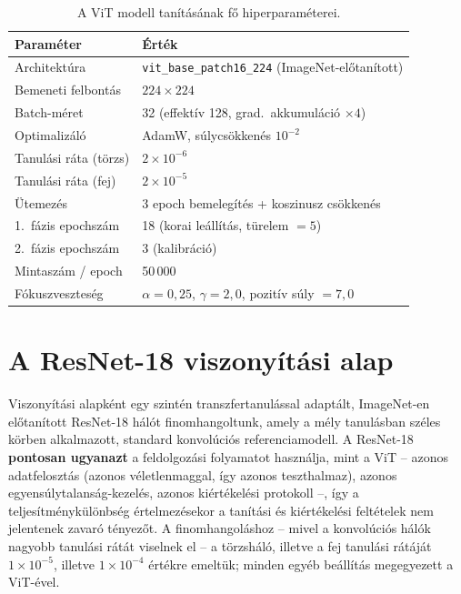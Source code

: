 \begin{table}[H]
  \centering
  \caption{A ViT modell tanításának fő hiperparaméterei.}
  \label{tab:hyperparams}
  \begin{tabular}{ll}
    \hline
    \textbf{Paraméter} & \textbf{Érték} \\
    \hline
    Architektúra            & \texttt{vit\_base\_patch16\_224} (ImageNet-előtanított) \\
    Bemeneti felbontás      & $224 \times 224$ \\
    Batch-méret             & 32 (effektív 128, grad.\ akkumuláció $\times 4$) \\
    Optimalizáló            & AdamW, súlycsökkenés $10^{-2}$ \\
    Tanulási ráta (törzs)   & $2 \times 10^{-6}$ \\
    Tanulási ráta (fej)     & $2 \times 10^{-5}$ \\
    Ütemezés                & 3 epoch bemelegítés + koszinusz csökkenés \\
    1.\ fázis epochszám     & 18 (korai leállítás, türelem $=5$) \\
    2.\ fázis epochszám     & 3 (kalibráció) \\
    Mintaszám / epoch       & 50\,000 \\
    Fókuszveszteség         & $\alpha = 0{,}25$, $\gamma = 2{,}0$, pozitív súly $= 7{,}0$ \\
    \hline
  \end{tabular}
\end{table}

\section{A ResNet-18 viszonyítási alap}

Viszonyítási alapként egy szintén transzfertanulással adaptált, ImageNet-en
előtanított ResNet-18 hálót \cite{he2016resnet} finomhangoltunk, amely a mély
tanulásban széles körben alkalmazott, standard konvolúciós referenciamodell.
A ResNet-18 \textbf{pontosan ugyanazt} a feldolgozási folyamatot használja, mint
a ViT -- azonos adatfelosztás (azonos véletlenmaggal, így azonos teszthalmaz),
azonos egyensúlytalanság-kezelés, azonos kiértékelési protokoll --, így a
teljesítménykülönbség értelmezésekor a tanítási és kiértékelési feltételek nem
jelentenek zavaró tényezőt. A finomhangoláshoz -- mivel a konvolúciós hálók
nagyobb tanulási rátát viselnek el -- a törzsháló, illetve a fej tanulási rátáját
$1 \times 10^{-5}$, illetve $1 \times 10^{-4}$ értékre emeltük; minden egyéb
beállítás megegyezett a ViT-ével.

